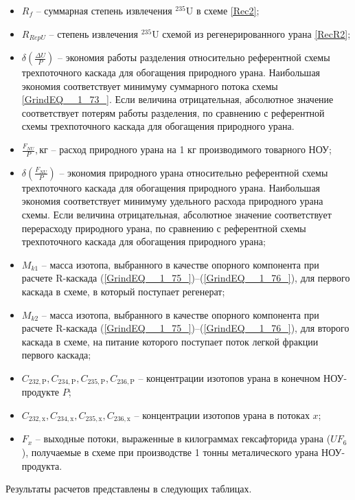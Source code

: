 \begin{itemize}
  \item $R_f$ -- суммарная степень извлечения $^{235}$U в схеме \ref{Rec2};
  \item $R_{RepU}$ -- степень извлечения $^{235}$U схемой из регенерированного урана \ref{RecR2};
  \item $\delta(\frac{\Delta U}{P})$ -- экономия работы разделения относительно референтной схемы трехпоточного каскада для обогащения природного урана. Наибольшая экономия соответствует минимуму суммарного потока схемы \ref{GrindEQ__1_73_}. Если величина отрицательная, абсолютное значение соответствует потерям работы разделения, по сравнению с референтной схемы трехпоточного каскада для обогащения природного урана.
  \item  $\frac{F_{NU}}{P}, \text{кг}$ -- расход природного урана на 1 кг производимого товарного НОУ;
  \item  $\delta(\frac{F_{NU}}{P})$ -- экономия природного урана относительно референтной схемы трехпоточного каскада для обогащения природного урана.  Наибольшая экономия соответствует минимуму удельного расхода природного урана схемы. Если величина отрицательная, абсолютное значение соответствует перерасходу природного урана, по сравнению с референтной схемы трехпоточного каскада для обогащения природного урана;
  \item $M_{k1}$ -- масса изотопа, выбранного в качестве опорного компонента при расчете R-каскада (\ref{GrindEQ__1_75_})--(\ref{GrindEQ__1_76_}), для первого каскада в схеме, в который поступает регенерат;
  \item $M_{k2}$ -- масса изотопа, выбранного в качестве опорного компонента при расчете R-каскада (\ref{GrindEQ__1_75_})--(\ref{GrindEQ__1_76_}), для второго каскада в схеме, на питание которого поступает поток легкой фракции первого каскада;
  \item $C_{232,\text{P}},C_{234,\text{P}},C_{235,\text{P}},C_{236,\text{P}}$ -- концентрации изотопов урана в конечном НОУ-продукте $P$;
  \item $C_{232,\text{x}},C_{234,\text{x}},C_{235,\text{x}},C_{236,\text{x}}$ -- концентрации изотопов урана в потоках $x$;
  \item $F_{x}$ -- выходные потоки, выраженные в килограммах гексафторида урана ($UF_6$), получаемые в схеме при производстве 1 тонны металического урана НОУ-продукта.
\end{itemize}


Результаты расчетов представлены в следующих таблицах.

